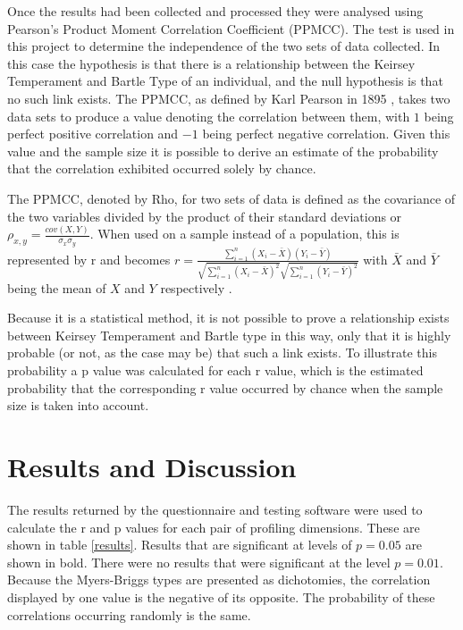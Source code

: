 \documentclass[12pt,a4paper,twoside]{report}
\begin{document}
Once the results had been collected and processed they were analysed using Pearson's Product Moment Correlation Coefficient (PPMCC). The test is used in this project to determine the independence of the two sets of data collected. In this case the hypothesis is that there is a relationship between the Keirsey Temperament and Bartle Type of an individual, and the null hypothesis is that no such link exists. The PPMCC, as defined by Karl Pearson in 1895 \cite{pearson1895note}, takes two data sets to produce a value denoting the correlation between them, with $1$ being perfect positive correlation and $-1$ being perfect negative correlation. Given this value and the sample size it is possible to derive an estimate of the probability that the correlation exhibited occurred solely by chance. 

The PPMCC, denoted by Rho, for two sets of data is defined as the covariance of the two variables divided by the product of their standard deviations or $\rho_{x,y}=\frac{cov(X,Y)}{\sigma_x \sigma_y}$. When used on a sample instead of a population, this is represented by r and becomes $r=\frac{\sum_{i=1}^{n}(X_i-\bar{X})(Y_i-\bar{Y})}{\sqrt{\sum_{i=1}^{n}(X_i-\bar{X})^2}\sqrt{\sum_{i=1}^{n}(Y_i-\bar{Y})^2}}$ with $\bar{X}$ and $\bar{Y}$ being the mean of $X$ and $Y$ respectively \cite{pearson1895note}. 

\vspace{0.1cm}
Because it is a statistical method, it is not possible to prove a relationship exists between Keirsey Temperament and Bartle type in this way, only that it is highly probable (or not, as the case may be) that such a link exists. To illustrate this probability a p value was calculated for each r value, which is the estimated probability that the corresponding r value occurred by chance when the sample size is taken into account.

\section{Results and Discussion}
The results returned by the questionnaire and testing software were used to calculate the r and p values for each pair of profiling dimensions. These are shown in table \ref{results}. Results that are significant at levels of $p = 0.05$ are shown in bold. There were no results that were significant at the level $p = 0.01$. Because the Myers-Briggs types are presented as dichotomies, the correlation displayed by one value is the negative of its opposite. The probability of these correlations occurring randomly is the same.
\end{document}
